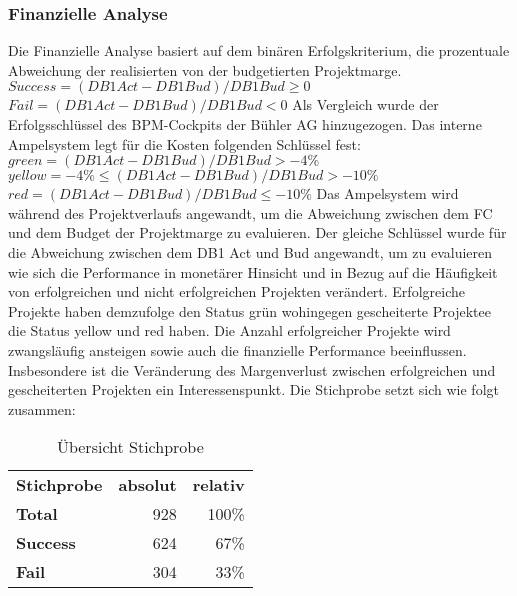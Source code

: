 \subsubsection{Finanzielle Analyse}
Die Finanzielle Analyse basiert auf dem binären Erfolgskriterium, die prozentuale Abweichung der realisierten von der budgetierten Projektmarge. 
\newline\newline
$Success = (DB1Act-DB1Bud)/DB1Bud \geq 0$\newline\newline
$Fail = (DB1Act-DB1Bud)/DB1Bud < 0$
\newline\newline
Als Vergleich wurde der Erfolgsschlüssel des BPM-Cockpits der Bühler AG hinzugezogen. Das interne Ampelsystem  legt für die Kosten folgenden Schlüssel fest:\newline\newline
$ green = (DB1Act-DB1Bud)/DB1Bud > -4\%$\newline\newline
$ yellow = -4\% \leq (DB1Act-DB1Bud)/DB1Bud > -10\%$\newline\newline
$ red = (DB1Act-DB1Bud)/DB1Bud  \leq -10\%$\newline\newline
Das Ampelsystem wird während des Projektverlaufs angewandt, um die Abweichung zwischen dem FC und dem Budget der Projektmarge zu evaluieren. Der gleiche Schlüssel wurde für die Abweichung zwischen dem DB1 Act und Bud angewandt, um zu evaluieren wie sich die Performance in monetärer Hinsicht und in Bezug auf die Häufigkeit von erfolgreichen und nicht erfolgreichen Projekten verändert. Erfolgreiche Projekte haben demzufolge den Status grün wohingegen gescheiterte Projektee die Status yellow und red haben. Die Anzahl erfolgreicher Projekte wird zwangsläufig ansteigen sowie auch die finanzielle Performance beeinflussen. Insbesondere ist die Veränderung des Margenverlust zwischen erfolgreichen und gescheiterten Projekten ein Interessenspunkt.\newline
Die Stichprobe setzt sich wie folgt zusammen:
\begin{table}[htbp]
	\centering
	\caption{Übersicht Stichprobe}
	\begin{tabular} {l|r|r}
		\textbf{Stichprobe} & \textbf{absolut} & \textbf{relativ} \\
		\textbf{Total} & 928 & 100\% \\
		\textbf{Success} & 624 & 67\% \\
		\textbf{Fail} & 304 & 33\% \\
	\end{tabular}
\end{table}
